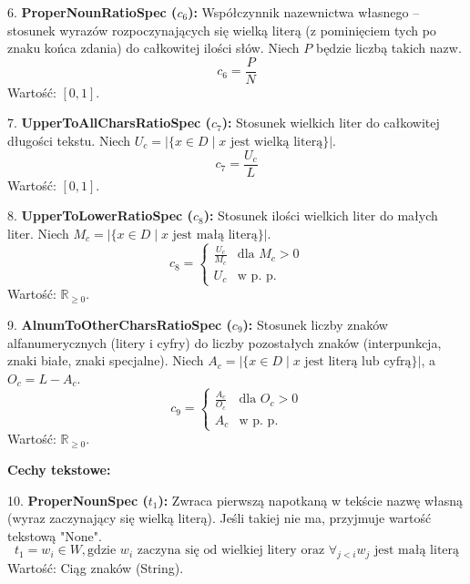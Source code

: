 \documentclass{article}
\begin{document}
6. \textbf{ProperNounRatioSpec ($c_6$):} Współczynnik nazewnictwa własnego – stosunek wyrazów rozpoczynających się wielką literą (z pominięciem tych po znaku końca zdania) do całkowitej ilości słów.
Niech $P$ będzie liczbą takich nazw.
   \begin{equation}
   c_6 = \frac{P}{N}
   \end{equation}
   Wartość: $[0, 1]$.

7. \textbf{UpperToAllCharsRatioSpec ($c_7$):} Stosunek wielkich liter do całkowitej długości tekstu.
   Niech $U_c = |\{x \in D \mid x \text{ jest wielką literą}\}|$.
   \begin{equation}
   c_7 = \frac{U_c}{L}
   \end{equation}
   Wartość: $[0, 1]$.

8. \textbf{UpperToLowerRatioSpec ($c_8$):} Stosunek ilości wielkich liter do małych liter.
   Niech $M_c = |\{x \in D \mid x \text{ jest małą literą}\}|$.
   \begin{equation}
   c_8 = \begin{cases}
    \frac{U_c}{M_c} & \text{dla } M_c > 0 \\
    U_c & \text{w p. p.}
   \end{cases}
   \end{equation}
   Wartość: $\mathbb{R}_{\ge 0}$.

9. \textbf{AlnumToOtherCharsRatioSpec ($c_9$):} Stosunek liczby znaków alfanumerycznych (litery i cyfry) do liczby pozostałych znaków (interpunkcja, znaki białe, znaki specjalne).
   Niech $A_c = |\{x \in D \mid x \text{ jest literą lub cyfrą}\}|$, a $O_c = L - A_c$.
   \begin{equation}
   c_9 = \begin{cases}
    \frac{A_c}{O_c} & \text{dla } O_c > 0 \\
    A_c & \text{w p. p.}
   \end{cases}
   \end{equation}
   Wartość: $\mathbb{R}_{\ge 0}$.

\textbf{Cechy tekstowe:}

10. \textbf{ProperNounSpec ($t_1$):} Zwraca pierwszą napotkaną w tekście nazwę własną (wyraz zaczynający się wielką literą). Jeśli takiej nie ma, przyjmuje wartość tekstową "None".
    \begin{equation}
    t_1 = w_i \in W, \text{gdzie } w_i \text{ zaczyna się od wielkiej litery oraz } \forall_{j < i} w_j \text{ jest małą literą}
    \end{equation}
    Wartość: Ciąg znaków (String).
\end{document}
